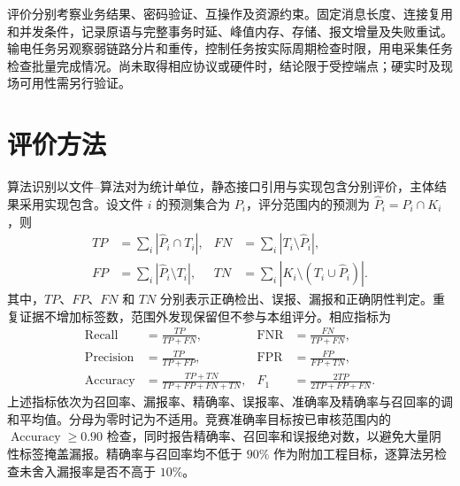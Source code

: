评价分别考察业务结果、密码验证、互操作及资源约束。固定消息长度、连接复用和并发条件，记录原语与完整事务时延、峰值内存、存储、报文增量及失败重试。输电任务另观察弱链路分片和重传，控制任务按实际周期检查时限，用电采集任务检查批量完成情况。尚未取得相应协议或硬件时，结论限于受控端点；硬实时及现场可用性需另行验证。


\section{评价方法}

算法识别以文件--算法对为统计单位，静态接口引用与实现包含分别评价，主体结果采用实现包含。设文件 $i$ 的预测集合为 $P_i$，评分范围内的预测为 $\widehat P_i=P_i\cap K_i$，则
\begin{align}
  TP &= \sum_i|\widehat P_i\cap T_i|, & FN &= \sum_i|T_i\setminus\widehat P_i|,\nonumber\\
  FP &= \sum_i|\widehat P_i\setminus T_i|, & TN &= \sum_i|K_i\setminus(T_i\cup\widehat P_i)|.
  \label{eq:evaluation-counts}
\end{align}
其中，$TP$、$FP$、$FN$ 和 $TN$ 分别表示正确检出、误报、漏报和正确阴性判定。重复证据不增加标签数，范围外发现保留但不参与本组评分。相应指标为
\begin{align}
  \operatorname{Recall}&=\frac{TP}{TP+FN}, & \operatorname{FNR}&=\frac{FN}{TP+FN},\nonumber\\
  \operatorname{Precision}&=\frac{TP}{TP+FP}, & \operatorname{FPR}&=\frac{FP}{FP+TN},\nonumber\\
  \operatorname{Accuracy}&=\frac{TP+TN}{TP+FP+FN+TN}, & F_1&=\frac{2TP}{2TP+FP+FN}.
  \label{eq:evaluation-metrics}
\end{align}
上述指标依次为召回率、漏报率、精确率、误报率、准确率及精确率与召回率的调和平均值。分母为零时记为不适用。竞赛准确率目标按已审核范围内的 $\operatorname{Accuracy}\geq0.90$ 检查，同时报告精确率、召回率和误报绝对数，以避免大量阴性标签掩盖漏报。精确率与召回率均不低于 $90\%$ 作为附加工程目标，逐算法另检查未舍入漏报率是否不高于 $10\%$。

